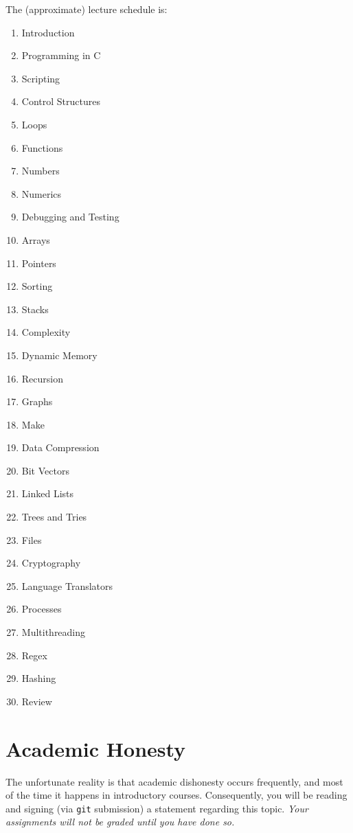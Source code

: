 \documentclass[11pt]{article}
\begin{document}
The (approximate) lecture schedule is:

\begin{multicols}{3}
  \begin{enumerate}[label*=(\arabic*)]
  \item Introduction
  \item Programming in C
  \item Scripting
  \item Control Structures
  \item Loops
  \item Functions
  \item Numbers
  \item Numerics
  \item Debugging and Testing
  \item Arrays
  \item Pointers
  \item Sorting
  \item Stacks
  \item Complexity
  \item Dynamic Memory
  \item Recursion
  \item Graphs
  \item Make
  \item Data Compression
  \item Bit Vectors
  \item Linked Lists
  \item Trees and Tries
  \item Files
  \item Cryptography
  \item Language Translators
  \item Processes
  \item Multithreading
  \item Regex
  \item Hashing
  \item Review
  \end{enumerate}
\end{multicols}

\section{Academic Honesty}

The unfortunate reality is that academic dishonesty occurs frequently, and most
of the time it happens in introductory courses. Consequently, you will be
reading and signing (via \texttt{git} submission) a statement regarding this
topic. \emph{Your assignments will not be graded until you have done so.}
\end{document}
